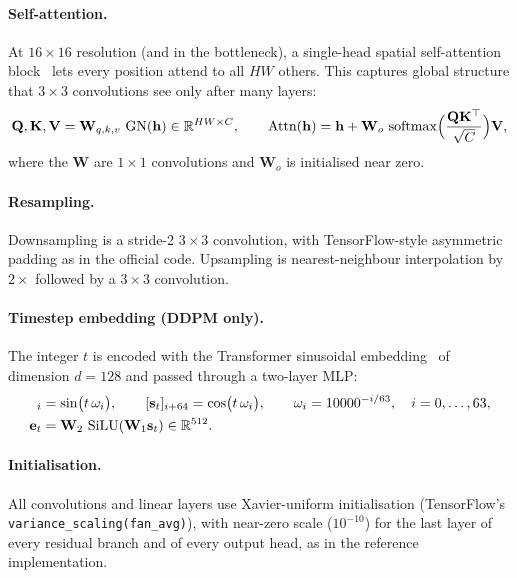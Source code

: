 \paragraph{Self-attention.} At $16\times16$ resolution (and in the bottleneck), a single-head spatial
self-attention block~\citep{vaswani2017attention} lets every position attend to all $HW$ others. This captures
global structure that $3\times3$ convolutions see only after many layers:
\begin{equation}
  \mathbf{Q},\mathbf{K},\mathbf{V} = \mathbf{W}_{q,k,v}\,\operatorname{GN}(\mathbf{h}) \in \mathbb{R}^{HW\times C},\qquad
  \operatorname{Attn}(\mathbf{h}) = \mathbf{h} + \mathbf{W}_o\,\operatorname{softmax}\!\Big(\frac{\mathbf{Q}\mathbf{K}^\top}{\sqrt{C}}\Big)\mathbf{V},
  \label{eq:attn}
\end{equation}
where the $\mathbf{W}$ are $1\times1$ convolutions and $\mathbf{W}_o$ is initialised near zero.

\paragraph{Resampling.} Downsampling is a stride-2 $3\times3$ convolution, with TensorFlow-style asymmetric padding
as in the official code. Upsampling is nearest-neighbour interpolation by $2\times$ followed by a $3\times3$
convolution.

\paragraph{Timestep embedding (DDPM only).} The integer $t$ is encoded with the Transformer sinusoidal
embedding~\citep{vaswani2017attention} of dimension $d=128$ and passed through a two-layer MLP:
\begin{align}
  [\mathbf{s}_t]_{i} &= \sin\!\big(t\,\omega_i\big),\qquad [\mathbf{s}_t]_{i+64} = \cos\!\big(t\,\omega_i\big),
  \qquad \omega_i = 10000^{-i/63},\quad i=0,\dots,63,\\
  \mathbf{e}_t &= \mathbf{W}_2\,\SiLU(\mathbf{W}_1\mathbf{s}_t)\in\mathbb{R}^{512}.
\end{align}

\paragraph{Initialisation.} All convolutions and linear layers use Xavier-uniform initialisation (TensorFlow's
\texttt{variance\_scaling(fan\_avg)}), with near-zero scale ($10^{-10}$) for the last layer of every residual
branch and of every output head, as in the reference implementation.

